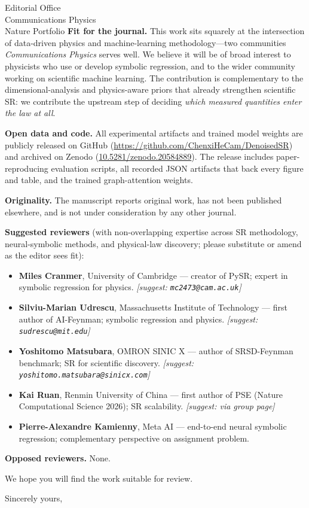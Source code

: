 \documentclass[11pt]{letter}
\begin{document}
\begin{letter}{Editorial Office\\Communications Physics\\Nature Portfolio}
\textbf{Fit for the journal.}
This work sits squarely at the intersection of data-driven physics and
machine-learning methodology---two communities \emph{Communications Physics}
serves well. We believe it will be of broad interest to physicists who use
or develop symbolic regression, and to the wider community working on
scientific machine learning. The contribution is complementary to the
dimensional-analysis and physics-aware priors that already strengthen
scientific SR: we contribute the upstream step of deciding \emph{which
measured quantities enter the law at all}.

\textbf{Open data and code.} All experimental artifacts and trained model
weights are publicly released on GitHub
(\url{https://github.com/ChenxiHeCam/DenoisedSR}) and archived on Zenodo
(\href{https://doi.org/10.5281/zenodo.20584889}{10.5281/zenodo.20584889}).
The release includes paper-reproducing evaluation scripts, all recorded
JSON artifacts that back every figure and table, and the trained
graph-attention weights.

\textbf{Originality.} The manuscript reports original work, has not been
published elsewhere, and is not under consideration by any other journal.

\textbf{Suggested reviewers} (with non-overlapping expertise across SR
methodology, neural-symbolic methods, and physical-law discovery; please
substitute or amend as the editor sees fit):

\begin{itemize}\itemsep0pt
\item \textbf{Miles Cranmer}, University of Cambridge --- creator of PySR;
expert in symbolic regression for physics. \emph{[suggest: \texttt{mc2473@cam.ac.uk}]}
\item \textbf{Silviu-Marian Udrescu}, Massachusetts Institute of Technology
--- first author of AI-Feynman; symbolic regression and physics. \emph{[suggest: \texttt{sudrescu@mit.edu}]}
\item \textbf{Yoshitomo Matsubara}, OMRON SINIC X --- author of SRSD-Feynman benchmark; SR for scientific discovery. \emph{[suggest: \texttt{yoshitomo.matsubara@sinicx.com}]}
\item \textbf{Kai Ruan}, Renmin University of China --- first author of PSE
(Nature Computational Science 2026); SR scalability. \emph{[suggest: via group page]}
\item \textbf{Pierre-Alexandre Kamienny}, Meta AI --- end-to-end neural symbolic regression; complementary perspective on assignment problem.
\end{itemize}

\textbf{Opposed reviewers.} None.

We hope you will find the work suitable for review.

\closing{Sincerely yours,}

\end{letter}
\end{document}
